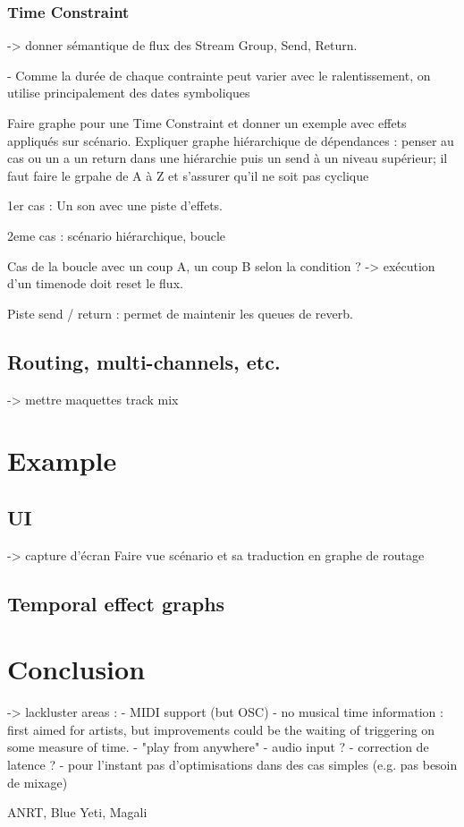 \documentclass{article}
\begin{document}
\subsubsection{Time Constraint}

-> donner sémantique de flux des Stream Group, Send, Return.

- Comme la durée de chaque contrainte peut varier avec le ralentissement, on utilise principalement 
des dates symboliques

Faire graphe pour une Time Constraint et donner un exemple avec effets appliqués sur scénario.
Expliquer graphe hiérarchique de dépendances : penser au cas ou un a un return dans une hiérarchie puis un send à un niveau supérieur; il faut faire le grpahe de A à Z et s'assurer qu'il ne soit pas cyclique

1er cas : 
Un son avec une piste d'effets.

2eme cas : scénario hiérarchique, boucle

Cas de la boucle avec un coup A, un coup B selon la condition ? 
-> exécution d'un timenode doit reset le flux.

Piste send / return : permet de maintenir les queues de reverb.


\subsection{Routing, multi-channels, etc.}
-> mettre maquettes track mix

\section{Example}
\subsection{UI}
-> capture d'écran
Faire vue scénario et sa traduction en graphe de routage 

\subsection{Temporal effect graphs}
\section{Conclusion}
-> lackluster areas : 
- MIDI support (but OSC)
- no musical time information : first aimed for artists, 
but improvements could be the waiting of triggering on some measure of time.
- "play from anywhere"
- audio input ?
- correction de latence ?
- pour l'instant pas d'optimisations dans des cas simples (e.g. pas besoin de mixage)
\begin{acknowledgments}
    ANRT, Blue Yeti, Magali
\end{acknowledgments} 


\end{document}
